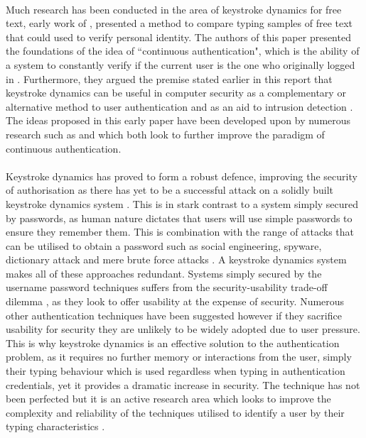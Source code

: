 \documentclass{article}
\begin{document}
\paragraph{}
Much research has been conducted in the area of keystroke dynamics for free text, early work of \parencite{Gunetti:2005}, presented a method to compare typing samples of free text that could used to verify personal identity. The authors of this paper  presented the foundations of the idea of ``continuous authentication", which is the ability of a system  to constantly verify if the current user is the one who originally logged in \parencite{sznur2015advances}. Furthermore, they argued the premise stated earlier in this report that keystroke dynamics can be useful in computer security as a complementary or alternative method to user authentication and as an aid to intrusion detection \parencite{Gunetti:2005}. The ideas proposed in this early paper have been developed upon by numerous research such as \parencite{contFreeText} and \parencite{sznur2015advances} which both look to further improve the paradigm of continuous authentication. 

\paragraph{}
Keystroke dynamics has proved to form a robust defence, improving the security of authorisation as there has yet to be a successful attack on a solidly built keystroke dynamics system \parencite{sznur2015advances}. This is in stark contrast to a system simply secured by passwords, as human nature dictates that users will use simple passwords to ensure they remember them. This is combination with the range of attacks that can be utilised to obtain a password such as social engineering, spyware, dictionary attack and mere brute force attacks \parencite{alsultan2013keystroke}. A keystroke dynamics system makes all of these approaches redundant. Systems simply secured by the username password techniques suffers from the security-usability trade-off dilemma \parencite{alsultan2013keystroke}, as they look to offer usability at the expense of security. Numerous other authentication techniques have been suggested however if they sacrifice usability for security they are unlikely to be widely adopted due to user pressure. This is why keystroke dynamics is an effective solution to the authentication problem, as it requires no further memory or interactions from the user, simply their typing behaviour which is used regardless when typing in authentication credentials, yet it provides a dramatic increase in security. The technique has not been perfected but it is an active research area which looks to improve the complexity and reliability of the techniques utilised to identify a user by their typing characteristics \parencite{sznur2015advances}. 
\end{document}
